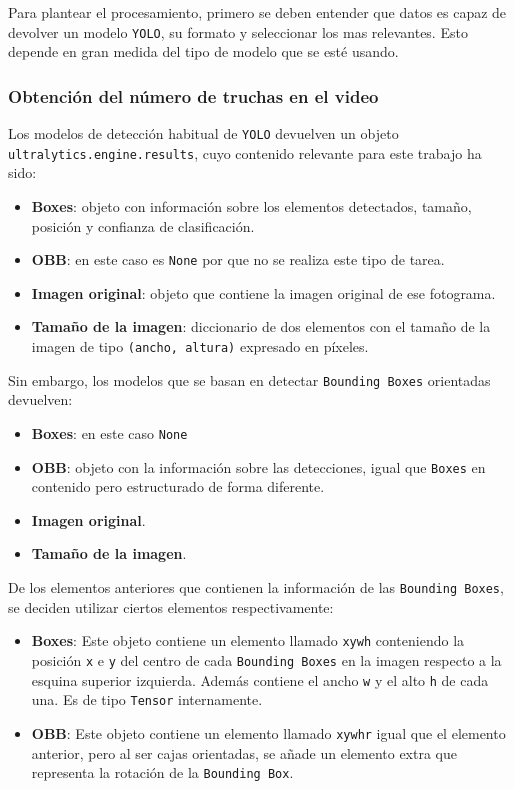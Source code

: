 Para plantear el procesamiento, primero se deben entender que datos es capaz de devolver un modelo \texttt{YOLO}, su formato y seleccionar los mas relevantes. Esto depende en gran medida del tipo de 
modelo que se esté usando.

\subsubsection{Obtención del número de truchas en el video}

Los modelos de detección habitual de \texttt{YOLO} devuelven un objeto \texttt{ultralytics.engine.results}, cuyo contenido relevante para este trabajo ha sido:

\begin{itemize}
    \item \textbf{Boxes}: objeto con información sobre los elementos detectados, tamaño, posición y confianza de clasificación.
    \item \textbf{OBB}: en este caso es \texttt{None} por que no se realiza este tipo de tarea.
    \item \textbf{Imagen original}: objeto que contiene la imagen original de ese fotograma.
    \item \textbf{Tamaño de la imagen}: diccionario de dos elementos con el tamaño de la imagen de tipo \texttt{(ancho, altura)} expresado en píxeles.
\end{itemize}

Sin embargo, los modelos que se basan en detectar \texttt{Bounding Boxes} orientadas devuelven:

\begin{itemize}
    \item \textbf{Boxes}: en este caso \texttt{None}
    \item \textbf{OBB}: objeto con la información sobre las detecciones, igual que \texttt{Boxes} en contenido pero estructurado de forma diferente.
    \item \textbf{Imagen original}.
    \item \textbf{Tamaño de la imagen}.
\end{itemize}

\clearpage

De los elementos anteriores que contienen la información de las \texttt{Bounding Boxes}, se deciden utilizar ciertos elementos respectivamente:
\begin{itemize}
    \item \textbf{Boxes}: Este objeto contiene un elemento llamado \texttt{xywh} conteniendo la posición \texttt{x} e \texttt{y} del centro de cada \texttt{Bounding Boxes} en la imagen respecto a la esquina 
    superior izquierda. Además contiene el ancho \texttt{w} y el alto \texttt{h} de cada una. Es de tipo \texttt{Tensor} internamente.
    \item \textbf{OBB}: Este objeto contiene un elemento llamado \texttt{xywhr} igual que el elemento anterior, pero al ser cajas orientadas, se añade un elemento extra que representa la rotación de la \texttt{Bounding Box}.
\end{itemize}

